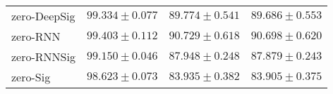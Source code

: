 \begin{tabular}{llll}
zero-DeepSig   &                           $ 99.334 \pm 0.077 $ &                           $ 89.774 \pm 0.541 $ &                           $ 89.686 \pm 0.553 $ \\
zero-RNN       &                           $ 99.403 \pm 0.112 $ &                           $ 90.729 \pm 0.618 $ &                           $ 90.698 \pm 0.620 $ \\
zero-RNNSig    &                           $ 99.150 \pm 0.046 $ &                           $ 87.948 \pm 0.248 $ &                           $ 87.879 \pm 0.243 $ \\
zero-Sig       &                           $ 98.623 \pm 0.073 $ &                           $ 83.935 \pm 0.382 $ &                           $ 83.905 \pm 0.375 $ \\
\bottomrule
\end{tabular}

